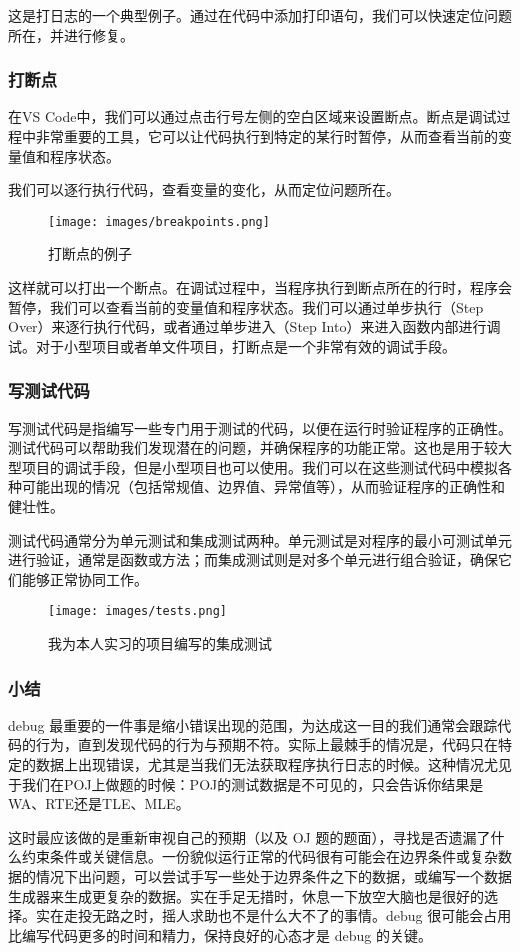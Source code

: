 \documentclass[../main.tex]{subfiles}
\begin{document}
这是打日志的一个典型例子。通过在代码中添加打印语句，我们可以快速定位问题所在，并进行修复。

\subsubsection{打断点}

在VS Code中，我们可以通过点击行号左侧的空白区域来设置断点。断点是调试过程中非常重要的工具，它可以让代码执行到特定的某行时暂停，从而查看当前的变量值和程序状态。

我们可以逐行执行代码，查看变量的变化，从而定位问题所在。

\begin{figure}[htbp]
\centering
\texttt{[image: images/breakpoints.png]}
\caption{打断点的例子}
\end{figure}

这样就可以打出一个断点。在调试过程中，当程序执行到断点所在的行时，程序会暂停，我们可以查看当前的变量值和程序状态。我们可以通过单步执行（Step Over）来逐行执行代码，或者通过单步进入（Step Into）来进入函数内部进行调试。对于小型项目或者单文件项目，打断点是一个非常有效的调试手段。

\subsubsection{写测试代码}

写测试代码是指编写一些专门用于测试的代码，以便在运行时验证程序的正确性。测试代码可以帮助我们发现潜在的问题，并确保程序的功能正常。这也是用于较大型项目的调试手段，但是小型项目也可以使用。我们可以在这些测试代码中模拟各种可能出现的情况（包括常规值、边界值、异常值等），从而验证程序的正确性和健壮性。

测试代码通常分为单元测试和集成测试两种。单元测试是对程序的最小可测试单元进行验证，通常是函数或方法；而集成测试则是对多个单元进行组合验证，确保它们能够正常协同工作。

\begin{figure}[htbp]
\centering
\texttt{[image: images/tests.png]}
\caption{我为本人实习的项目编写的集成测试}
\end{figure}

\subsubsection{小结}

debug 最重要的一件事是缩小错误出现的范围，为达成这一目的我们通常会跟踪代码的行为，直到发现代码的行为与预期不符。实际上最棘手的情况是，代码只在特定的数据上出现错误，尤其是当我们无法获取程序执行日志的时候。这种情况尤见于我们在POJ上做题的时候：POJ的测试数据是不可见的，只会告诉你结果是WA、RTE还是TLE、MLE。

这时最应该做的是重新审视自己的预期（以及 OJ 题的题面），寻找是否遗漏了什么约束条件或关键信息。一份貌似运行正常的代码很有可能会在边界条件或复杂数据的情况下出问题，可以尝试手写一些处于边界条件之下的数据，或编写一个数据生成器来生成更复杂的数据。实在手足无措时，休息一下放空大脑也是很好的选择。实在走投无路之时，摇人求助也不是什么大不了的事情。debug 很可能会占用比编写代码更多的时间和精力，保持良好的心态才是 debug 的关键。
\end{document}

